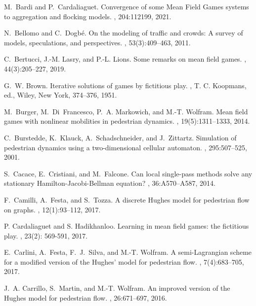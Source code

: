 \documentclass{cmslatex}
\begin{document}
\begin{thebibliography}{}
M.~Bardi and P.~Cardaliaguet.
\newblock Convergence of some {M}ean {F}ield {G}ames systems to aggregation and flocking models.
, 204:112199, 2021.

N.~Bellomo and C.~Dogb\'{e}.
\newblock On the modeling of traffic and crowds: {A} survey of models,
  speculations, and perspectives.
, 53(3):409--463, 2011.

C.~Bertucci, J.-M. Lasry, and P.-L. Lions.
\newblock Some remarks on mean field games.
,
  44(3):205--227, 2019.
  
 G.~W. Brown. 
\newblock Iterative solutions of games by fictitious play.
, 
T. C. Koopmans, ed., Wiley, New York, 374--376, 1951.

M.~Burger, M.~Di~Francesco, P.~A. Markowich, and M.-T. Wolfram.
\newblock Mean field games with nonlinear mobilities in pedestrian dynamics.
, 19(5):1311--1333,
  2014.

C.~Burstedde, K.~Klauck, A.~Schadschneider, and J.~Zittartz.
\newblock Simulation of pedestrian dynamics using a two-dimensional cellular
  automaton.
, 295:507--525, 2001.

S.~Cacace, E.~Cristiani, and M.~Falcone. 
\newblock Can local single-pass methods solve any stationary Hamilton-Jacobi-Bellman equation?
, 36:A570--A587, 2014.

F.~Camilli, A.~Festa, and S.~Tozza.
\newblock A discrete {H}ughes model for pedestrian flow on graphs.
, 12(1):93--112, 2017.

P. Cardaliaguet and S. Hadikhanloo. 
\newblock Learning in mean field games: the fictitious play.
, 23(2): 569-591, 2017.

E.~Carlini, A.~Festa, F.~J.~Silva, and M.-T. Wolfram.
\newblock A semi-{L}agrangian scheme for a modified version of the {H}ughes'
  model for pedestrian flow.
, 7(4):683--705, 2017.

J.~A. Carrillo, S.~Martin, and M.-T. Wolfram.
\newblock An improved version of the {H}ughes model for pedestrian flow.
, 26:671--697, 2016.


\end{thebibliography}
\end{document}
